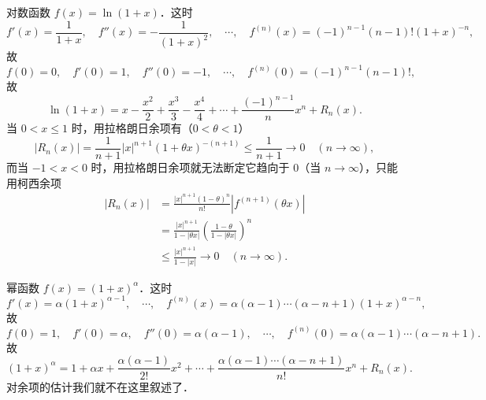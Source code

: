 对数函数 $f(x) = \ln(1+x)$．这时
\[
f'(x) = \frac{1}{1+x}, \quad f''(x) = -\frac{1}{(1+x)^2}, \quad \cdots, \quad f^{(n)}(x) = (-1)^{n-1}(n-1)!(1+x)^{-n},
\]
故
\[
f(0) = 0, \quad f'(0) = 1, \quad f''(0) = -1, \quad \cdots, \quad f^{(n)}(0) = (-1)^{n-1}(n-1)!,
\]
故
\[
\ln(1+x) = x - \frac{x^2}{2} + \frac{x^3}{3} - \frac{x^4}{4} + \cdots + \frac{(-1)^{n-1}}{n}x^n + R_n(x).
\]
当 $0 < x \leqslant 1$ 时，用拉格朗日余项有（$0 < \theta < 1$）
\[
|R_n(x)| = \frac{1}{n+1}|x|^{n+1}(1+\theta x)^{-(n+1)} \leqslant \frac{1}{n+1} \to 0 \quad (n \to \infty),
\]
而当 $-1 < x < 0$ 时，用拉格朗日余项就无法断定它趋向于 $0$（当 $n \to \infty$），只能用柯西余项
\begin{align*}
|R_n(x)| &= \frac{|x|^{n+1}(1-\theta)^n}{n!}|f^{(n+1)}(\theta x)| \\
&= \frac{|x|^{n+1}}{1-|\theta x|}\left(\frac{1-\theta}{1-|\theta x|}\right)^n \\
&\leqslant \frac{|x|^{n+1}}{1-|x|} \to 0 \quad (n \to \infty).
\end{align*}

幂函数 $f(x) = (1+x)^\alpha$．这时
\[
f'(x) = \alpha(1+x)^{\alpha-1}, \quad \cdots, \quad f^{(n)}(x) = \alpha(\alpha-1)\cdots(\alpha-n+1)(1+x)^{\alpha-n},
\]
故
\[
f(0) = 1, \quad f'(0) = \alpha, \quad f''(0) = \alpha(\alpha-1), \quad \cdots, \quad f^{(n)}(0) = \alpha(\alpha-1)\cdots(\alpha-n+1).
\]
故
\[
(1+x)^\alpha = 1 + \alpha x + \frac{\alpha(\alpha-1)}{2!}x^2 + \cdots + \frac{\alpha(\alpha-1)\cdots(\alpha-n+1)}{n!}x^n + R_n(x).
\]
对余项的估计我们就不在这里叙述了．

